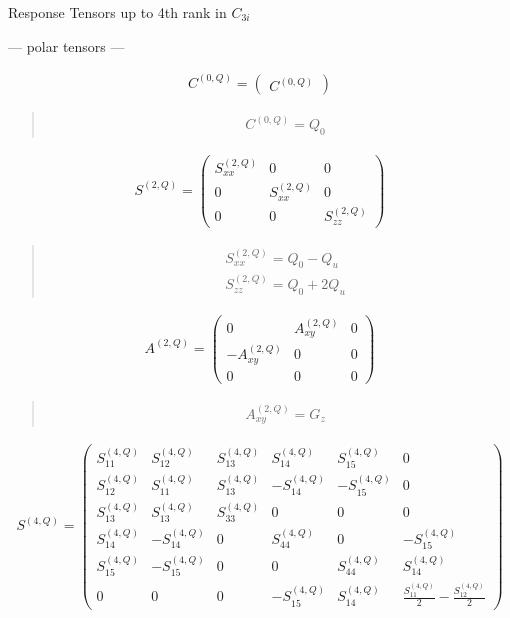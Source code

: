 \documentclass[fleqn,10pt]{jsarticle}
\begin{document}
\setcounter{MaxMatrixCols}{16}

\begin{center}
\LARGE
Response Tensors up to 4th rank in $C_{3i}$
\end{center}
\begin{center}\LARGE --- polar tensors ---\end{center}
\begin{align*}
C^{(0,Q)} = \begin{pmatrix} C^{(0,Q)} \end{pmatrix}
\end{align*}
\begin{quote}
\begin{align*}
& C^{(0,Q)} = Q_{0}
\end{align*}
\end{quote}
\begin{align*}
S^{(2,Q)} = \begin{pmatrix} S^{(2,Q)}_{xx} & 0 & 0 \\ 0 & S^{(2,Q)}_{xx} & 0 \\ 0 & 0 & S^{(2,Q)}_{zz} \end{pmatrix}
\end{align*}
\begin{quote}
\begin{align*}
& S^{(2,Q)}_{xx} = Q_{0} - Q_{u} \\
& S^{(2,Q)}_{zz} = Q_{0} + 2 Q_{u}
\end{align*}
\end{quote}
\begin{align*}
A^{(2,Q)} = \begin{pmatrix} 0 & A^{(2,Q)}_{xy} & 0 \\ - A^{(2,Q)}_{xy} & 0 & 0 \\ 0 & 0 & 0 \end{pmatrix}
\end{align*}
\begin{quote}
\begin{align*}
& A^{(2,Q)}_{xy} = G_{z}
\end{align*}
\end{quote}
\begin{align*}
S^{(4,Q)} = \begin{pmatrix} S^{(4,Q)}_{11} & S^{(4,Q)}_{12} & S^{(4,Q)}_{13} & S^{(4,Q)}_{14} & S^{(4,Q)}_{15} & 0 \\ S^{(4,Q)}_{12} & S^{(4,Q)}_{11} & S^{(4,Q)}_{13} & - S^{(4,Q)}_{14} & - S^{(4,Q)}_{15} & 0 \\ S^{(4,Q)}_{13} & S^{(4,Q)}_{13} & S^{(4,Q)}_{33} & 0 & 0 & 0 \\ S^{(4,Q)}_{14} & - S^{(4,Q)}_{14} & 0 & S^{(4,Q)}_{44} & 0 & - S^{(4,Q)}_{15} \\ S^{(4,Q)}_{15} & - S^{(4,Q)}_{15} & 0 & 0 & S^{(4,Q)}_{44} & S^{(4,Q)}_{14} \\ 0 & 0 & 0 & - S^{(4,Q)}_{15} & S^{(4,Q)}_{14} & \frac{S^{(4,Q)}_{11}}{2} - \frac{S^{(4,Q)}_{12}}{2} \end{pmatrix}
\end{align*}
\end{document}
